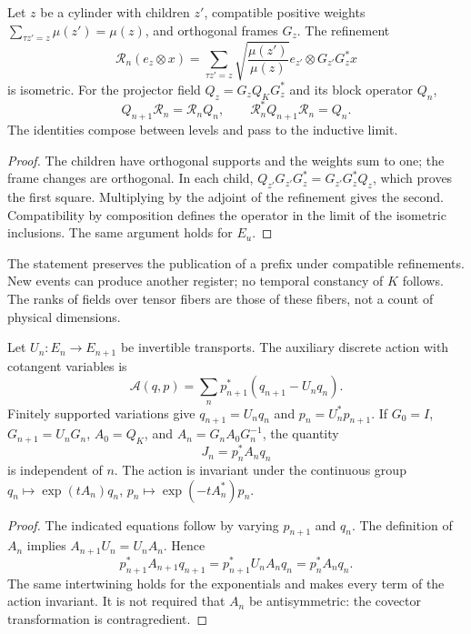 \begin{proposition}
\label{x_reciprocidad:lib01:refinamiento}
Let \(z\) be a cylinder with children \(z'\), compatible positive weights
\(\sum_{\tau z'=z}\mu(z')=\mu(z)\), and orthogonal frames \(G_z\).
The refinement
\[
 \mathcal R_n(e_z\otimes x)=
 \sum_{\tau z'=z}\sqrt{\frac{\mu(z')}{\mu(z)}}
 e_{z'}\otimes G_{z'}G_z^*x
\]
is isometric. For the projector field \(Q_z=G_zQ_KG_z^*\) and its block operator \(Q_n\),
\[
 Q_{n+1}\mathcal R_n=\mathcal R_nQ_n,
 \qquad \mathcal R_n^*Q_{n+1}\mathcal R_n=Q_n.
\]
The identities compose between levels and pass to the inductive limit.
\end{proposition}
\begin{proof}
The children have orthogonal supports and the weights sum to one; the frame
changes are orthogonal. In each child,
\(Q_{z'}G_{z'}G_z^*=G_{z'}G_z^*Q_z\), which proves the first
square. Multiplying by the adjoint of the refinement gives the second.
Compatibility by composition defines the operator in the limit of
the isometric inclusions. The same argument holds for \(E_u\).
\end{proof}

The statement preserves the publication of a prefix under compatible
refinements. New events can produce another register; no temporal
constancy of \(K\) follows. The ranks of fields over tensor
fibers are those of these fibers, not a count of physical dimensions.

\begin{proposition}
\label{x_reciprocidad:lib01:carga-noether}
Let \(U_n:E_n\to E_{n+1}\) be invertible transports. The auxiliary discrete action with cotangent variables is
\[
 \mathcal A(q,p)=\sum_n p_{n+1}^*(q_{n+1}-U_nq_n).
\]
Finitely supported variations give \(q_{n+1}=U_nq_n\) and \(p_n=U_n^*p_{n+1}\). If \(G_0=I\), \(G_{n+1}=U_nG_n\), \(A_0=Q_K\), and \(A_n=G_nA_0G_n^{-1}\), the quantity
\[
 J_n=p_n^*A_nq_n
\]
is independent of \(n\). The action is invariant under the continuous group \(q_n\mapsto\exp(tA_n)q_n\), \(p_n\mapsto\exp(-tA_n^*)p_n\).
\end{proposition}
\begin{proof}
The indicated equations follow by varying \(p_{n+1}\) and \(q_n\). The definition of \(A_n\) implies \(A_{n+1}U_n=U_nA_n\). Hence
\[
 p_{n+1}^*A_{n+1}q_{n+1}
 =p_{n+1}^*U_nA_nq_n=p_n^*A_nq_n.
\]
The same intertwining holds for the exponentials and makes every term of the action invariant. It is not required that \(A_n\) be antisymmetric: the covector transformation is contragredient.
\end{proof}

